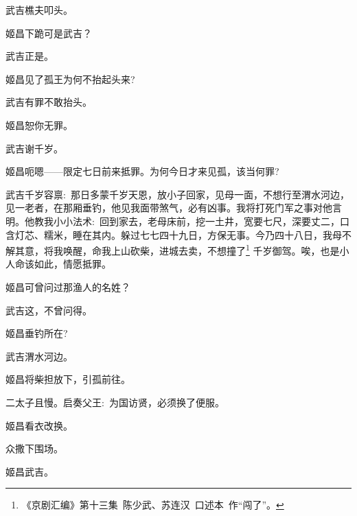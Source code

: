 {武吉\hspace{30pt}樵夫叩头。

姬昌\hspace{30pt}下跪可是武吉？

武吉\hspace{30pt}正是。

姬昌\hspace{30pt}见了孤王为何不抬起头来?

武吉\hspace{30pt}有罪不敢抬头。

姬昌\hspace{30pt}恕你无罪。

武吉\hspace{30pt}谢千岁。

姬昌\hspace{30pt}呃嗯------限定七日前来抵罪。为何今日才来见孤，该当何罪?

\setlength{\hangindent}{56pt}   %
{武吉\hspace{30pt}千岁容禀:~那日多蒙千岁天恩，放小子回家，见母一面，不想行至渭水河边，见一老者，在那厢垂钓，他见我面带煞气，必有凶事。我将打死门军之事对他言明。他教我小小法术:~回到家去，老母床前，挖一土井，宽要七尺，深要丈二，口含灯芯、糯米，睡在其内。躲过七七四十九日，方保无事。今乃四十八日，我母不解其意，将我唤醒，命我上山砍柴，进城去卖，不想撞了\footnote{《京剧汇编》第十三集~陈少武、苏连汉~口述本~作``闯了''。}%
千岁御驾。唉，也是小人命该如此，情愿抵罪。}

姬昌\hspace{30pt}可曾问过那渔人的名姓？

武吉\hspace{30pt}这，不曾问得。

姬昌\hspace{30pt}垂钓所在?

武吉\hspace{30pt}渭水河边。

姬昌\hspace{30pt}将柴担放下，引孤前往。

{\akai 二}太子\hspace{20pt}且慢。启奏父王:~为国访贤，必须换了便服。

姬昌\hspace{30pt}看衣改换。

众\hspace{41pt}撒下围场。

姬昌\hspace{30pt}武吉。

}
